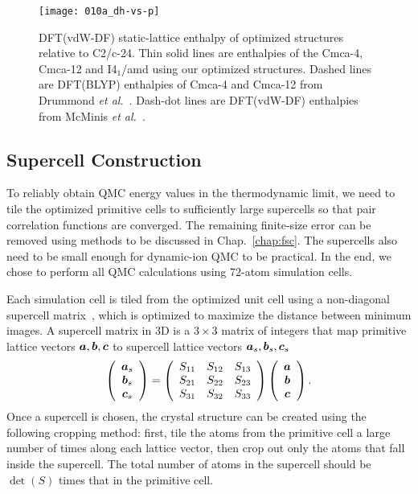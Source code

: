 \begin{figure}[h]
\centering
\texttt{[image: 010a\_dh-vs-p]}
\caption{DFT(vdW-DF) static-lattice enthalpy of optimized structures relative to C2/c-24. Thin solid lines are enthalpies of the Cmca-4, Cmca-12 and I4$_1$/amd using our optimized structures. Dashed lines are DFT(BLYP) enthalpies of Cmca-4 and Cmca-12 from Drummond \textit{et al.}~\cite{Drummond2015}. Dash-dot lines are DFT(vdW-DF) enthalpies from McMinis \textit{et al.}~\cite{McMinis2015}.}
\label{fig:dft-opt-geo}
\end{figure}

\subsection{Supercell Construction}
To reliably obtain QMC energy values in the thermodynamic limit, we need to tile the optimized primitive cells to sufficiently large supercells so that pair correlation functions are converged.
The remaining finite-size error can be removed using methods to be discussed in Chap.~\ref{chap:fsc}.
The supercells also need to be small enough for dynamic-ion QMC to be practical.
In the end, we chose to perform all QMC calculations using 72-atom simulation cells.

Each simulation cell is tiled from the optimized unit cell using a non-diagonal supercell matrix~\cite{Lloyd-Williams2015}, which is optimized to maximize the distance between minimum images.
A supercell matrix in 3D is a $3\times 3$ matrix of integers that map primitive lattice vectors $\boldsymbol{a}, \boldsymbol{b}, \boldsymbol{c}$ to supercell lattice vectors  $\boldsymbol{a}_s, \boldsymbol{b}_s, \boldsymbol{c}_s$
\begin{align}
\left(\begin{array}{c}
\boldsymbol{a}_s \\
\boldsymbol{b}_s \\
\boldsymbol{c}_s
\end{array}\right) =
\left(\begin{array}{ccc}
S_{11} & S_{12} & S_{13} \\
S_{21} & S_{22} & S_{23} \\
S_{31} & S_{32} & S_{33}
\end{array}\right)
\left(\begin{array}{c}
\boldsymbol{a} \\
\boldsymbol{b} \\
\boldsymbol{c}
\end{array}\right).
\end{align}
Once a supercell is chosen, the crystal structure can be created using the following cropping method: first, tile the atoms from the primitive cell a large number of times along each lattice vector, then crop out only the atoms that fall inside the supercell.
The total number of atoms in the supercell should be $\det(S)$ times that in the primitive cell.

